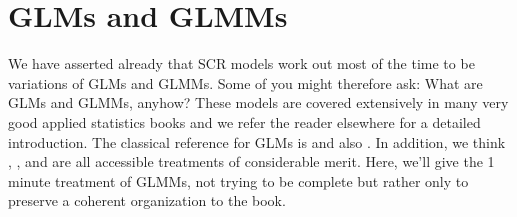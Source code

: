 
\section{
GLMs and GLMMs}
\label{glms.sec.glmms}
We have asserted already that SCR models work out most of the time to
be variations of GLMs and GLMMs. Some of you might therefore ask: What
are GLMs and GLMMs, anyhow?   These models are covered extensively in
many very good applied statistics books and we refer the reader
elsewhere for a detailed introduction.  The
classical reference for GLMs is \citet{nelder_wedderburn:1972} and
also \citet{mccullagh_nelder:1989}. In addition, we think \citet{kery:2010},
\citet{kery_schaub:2011}, and \citet{zuur_etal:2009} are all
accessible treatments of considerable merit. 
Here, we'll give the 1
minute
treatment of GLMMs, not trying to be complete but rather only
to preserve a coherent organization to the book.


